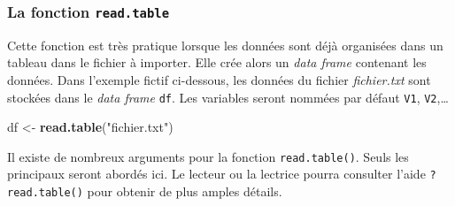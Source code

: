 \documentclass[
  11pt,
]{book}
\newenvironment{Shaded}{\begin{snugshade}}{\end{snugshade}}
\newcommand{\KeywordTok}[1]{\textcolor[rgb]{0.13,0.29,0.53}{\textbf{#1}}}
\newcommand{\NormalTok}[1]{#1}
\newcommand{\StringTok}[1]{\textcolor[rgb]{0.31,0.60,0.02}{#1}}
\numberwithin{equation}{section}
\numberwithin{countremarque}{section}
\begin{document}
\hypertarget{la-fonction-read.table}{%
\subsubsection{\texorpdfstring{La fonction \texttt{read.table}}{La fonction read.table}}\label{la-fonction-read.table}}

Cette fonction est très pratique lorsque les données sont déjà organisées dans un tableau dans le fichier à importer. Elle crée alors un \emph{data frame} contenant les données. Dans l'exemple fictif ci-dessous, les données du fichier \emph{fichier.txt} sont stockées dans le \emph{data frame} \texttt{df}. Les variables seront nommées par défaut \texttt{V1}, \texttt{V2},\ldots{}

\begin{Shaded}
\begin{Highlighting}[]
\NormalTok{df \textless{}{-}}\StringTok{ }\KeywordTok{read.table}\NormalTok{(}\StringTok{"fichier.txt"}\NormalTok{)}
\end{Highlighting}
\end{Shaded}

Il existe de nombreux arguments pour la fonction \texttt{read.table()}. Seuls les principaux seront abordés ici. Le lecteur ou la lectrice pourra consulter l'aide \texttt{?read.table()} pour obtenir de plus amples détails.
\end{document}
